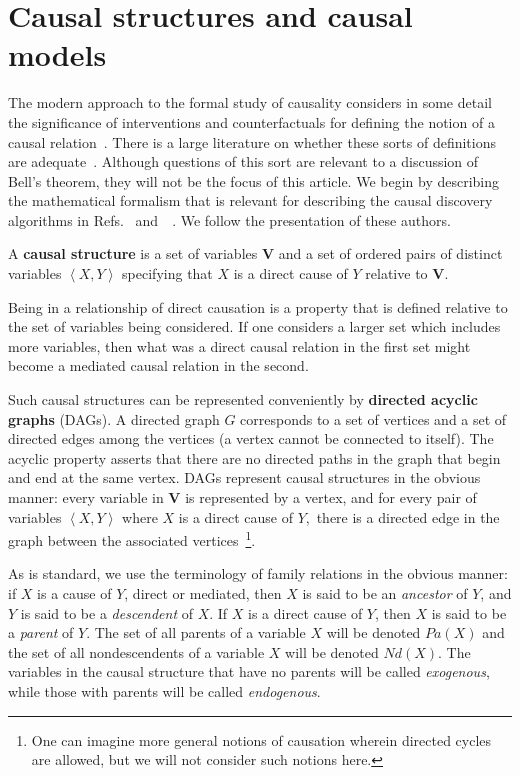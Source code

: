 \documentclass[letterpaper,onecolumn,nofootinbib]{revtex4}
\begin{document}
\section{Causal structures and causal models}
\label{sec:causalmod}

The modern approach to the formal study of causality considers in some detail the significance of interventions and counterfactuals for defining the notion of a causal relation~\cite{Pearl2009,Spirtes2001}.  There is a large literature on whether these sorts of definitions are adequate~\cite{OxfordHandbook}.   Although questions of this sort are relevant to a discussion of Bell's theorem, they will not be the focus of this article.
We begin by describing the mathematical formalism that is relevant for describing the causal discovery algorithms in Refs.~\cite{Pearl2009} and~~\cite{Spirtes2001}.  We follow the presentation of these authors.

A \textbf{causal structure} is a set of variables $\mathbf{V}$ and a set of
ordered pairs of distinct variables $\left\langle X,Y\right\rangle $
specifying that $X$ is a direct cause of $Y$ relative to $\mathbf{V}.$

Being in a relationship of direct causation is a property that is defined
relative to the set of variables being considered. If one considers a
larger set which includes more variables, then what was a direct causal
relation in the first set might become a mediated causal relation in the
second.

Such causal structures can be represented conveniently by \textbf{directed
acyclic graphs} (DAGs).  A directed graph $G$ corresponds to a set of
vertices and a set of directed edges among the vertices (a vertex cannot be
connected to itself).  The acyclic property asserts that there are no directed paths in
the graph that begin and end at the same vertex.  DAGs represent causal
structures in the obvious manner: every variable in $\mathbf{V}$ is
represented by a vertex, and for every pair of variables $\left\langle
X,Y\right\rangle $ where $X$ is a direct cause of $Y,$ there is a directed
edge in the graph between the associated vertices~\footnote{One can imagine more general notions of causation wherein directed cycles are allowed, but we will not consider such notions here.}.

As is standard, we use the terminology of family relations in the obvious manner: if $X$
is a cause of $Y$, direct or mediated, then $X$ is said to be an \emph{ancestor} of $Y$, and $Y$ is said to be a \emph{descendent} of $X$. If $X$ is a direct cause of $Y$, then $X$ is said to be a \emph{parent} of $Y$.    The set of all parents of a variable $X$ will be denoted $Pa(X)$ and the set of all nondescendents of a variable $X$ will be denoted $Nd(X)$.  \color{black} The variables in the causal structure that have no parents will be called \emph{exogenous}, while those with parents will be called \emph{endogenous}. 
\end{document}

